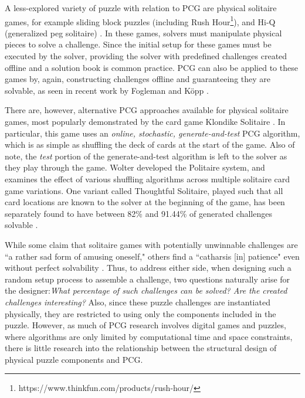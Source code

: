 \documentclass[journal]{IEEEtran}
\begin{document}
A less-explored variety of puzzle with relation to PCG 
are physical solitaire games, for example
sliding block puzzles \cite{FIFTEEN} (including Rush Hour\footnote{https://www.thinkfun.com/products/rush-hour/}), 
and Hi-Q (generalized peg solitaire) \cite{PEG}. In these games, solvers must manipulate physical pieces to solve a challenge. Since the initial setup for these games must be executed by the solver, providing the solver with predefined challenges created offline and a solution book is common practice. PCG can also be applied to these games by, again, constructing challenges offline and guaranteeing they are solvable, as seen in recent work by Fogleman \cite{RUSHHOUR} and K{\"o}pp \cite{TANGRAM}. 

There are, however, alternative PCG approaches available for physical solitaire games, most popularly demonstrated by the card game Klondike Solitaire \cite{morehead2014complete}. In particular, this game uses an {\it online, stochastic, generate-and-test} PCG algorithm, which is as simple as shuffling the deck of cards at the start of the game. Also of note, the {\it test} portion of the generate-and-test algorithm is left to the solver as they play through the game. Wolter \cite{SOLITAIREVARIANTS} developed the Politaire system, and examines the effect of various shuffling algorithms across multiple solitaire card game variations. One variant called Thoughtful Solitaire, played such that all card locations are known to the solver at the beginning of the game, has been separately found to have between 82\% and 91.44\% of generated challenges solvable \cite{THOUGHTFUL}. 

While some claim that solitaire games with potentially unwinnable challenges are ``a rather sad form of amusing oneself," \cite{de1981pretzel} others find a ``catharsis [in] patience" even without perfect solvability \cite{morehead2014complete}. Thus, to address either side, when designing such a random setup process to assemble a challenge, two questions naturally arise for the designer:{\it What percentage of such challenges can be solved? Are the created challenges interesting?}\cite{MCPUZZLE} Also, since these puzzle challenges are instantiated physically, they are restricted to using only the components included in the puzzle. However, as much of PCG research involves digital games and puzzles, where algorithms are only limited by computational time and space constraints, there is little research into the relationship between the structural design of physical puzzle components and PCG. 
\end{document}
